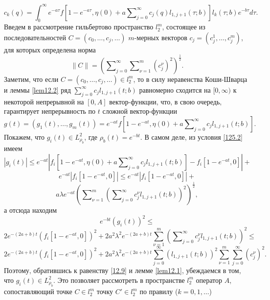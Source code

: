 \begin{equation}\label{125.9}
c_k(q)=\int_{0}^\infty e^{-a\tau}f\left[1-e^{-a\tau},\eta(0)+ a\sum\nolimits_{j=0}^\infty c_j(q)l_{1,j+1}(\tau;b)\right]l_{k}(\tau;b)e^{-b\tau} d\tau.
\end{equation}
Введем в рассмотрение гильбертово пространство $l_2^m$, состоящее из последовательностей  $C=(c_0,\ldots,c_j,\ldots)$ $m$-мерных векторов $c_j=(c_j^1,\ldots,c_j^m)$,  для которых определена норма
\begin{equation}\label{125.10}
\|C\|=\left(\sum\nolimits_{j=0}^\infty \sum\nolimits_{\nu=1}^{m}(c_j^\nu)^2\right)^\frac12.
\end{equation}
Заметим, что если $C=(c_0,\ldots,c_j,\ldots)\in l_2^m$, то  в силу  неравенства Коши-Шварца и леммы \ref{lem12.2} ряд $\sum\nolimits_{j=0}^\infty c_jl_{1,j+1}(t;b)$ равномерно сходится на $[0,\infty)$ к некоторой непрерывной на $[0,A]$ вектор-функции, что, в свою очередь, гарантирует непрерывность по $t$  сложной вектор-функции
\begin{equation}\label{125.11}
g(t)=(g_1(t),\ldots,g_m(t))= e^{-at}f\left[1-e^{-at},\eta(0)+ a\sum\nolimits_{j=0}^\infty c_jl_{1,j+1}(t;b)\right].
\end{equation}
Покажем, что $g_i(t)\in L^2_{\rho_b}$, где $\rho_b(t)=e^{-bt}$. В самом деле, из условия \eqref{125.2} имеем
$$
|g_i(t)|\le e^{-at}\left|f_i\left[1-e^{-at},\eta(0)+ a\sum\nolimits_{j=0}^\infty c_jl_{1,j+1}(t;b)\right]-f_i\left[1-e^{-at},0\right]\right|+
$$
$$
e^{-at}\left|f_i\left[1-e^{-at},0\right]\right|\le e^{-at}\left|f_i\left[1-e^{-at},0\right]\right|+
$$
$$
a\lambda e^{-at} \left(\sum\nolimits_{\nu=1}^m
\left(\sum\nolimits_{j=0}^\infty c_j^\nu l_{1,j+1}(t;b)\right)^2 \right)^\frac12,
$$
а отсюда находим
$$
e^{-bt}(g_i(t))^2\le
$$
$$
2e^{-(2a+b)t}\left(f_i\left[1-e^{-at},0\right]\right)^2+
2a^2\lambda^2 e^{-(2a+b)t} \sum_{\nu=1}^m
\left(\sum\nolimits_{j=0}^\infty c_j^\nu l_{1,j+1}(t;b)\right)^2\le
$$
$$
2e^{-(2a+b)t}\left(f_i\left[1-e^{-at},0\right]\right)^2+
2a^2\lambda^2 e^{-(2a+b)t} \sum_{j=0}^\infty(l_{1,j+1}(t;b))^2\sum_{\nu=1}^m
\sum_{j=0}^\infty (c_j^\nu)^2.
$$
Поэтому, обратившись к равенству \eqref{12.9} и лемме \ref{lem12.1}, убеждаемся в том, что $g_i(t)\in L^2_{\rho_b}$.
Это позволяет рассмотреть в пространстве $l_2^m$  оператор $A$, сопоставляющий точке $C\in l_2^m$ точку $C'\in l_2^m$ по правилу ($k=0,1,\ldots$)

